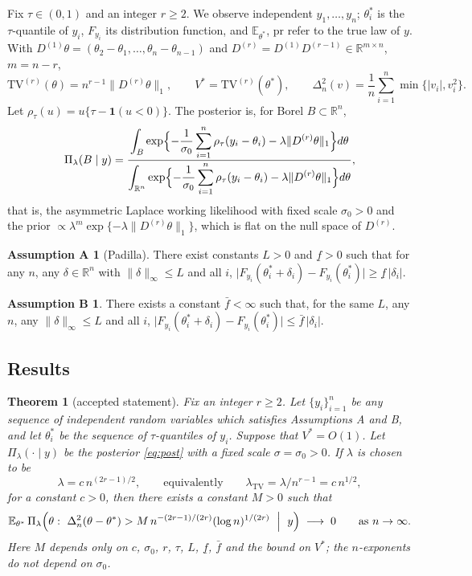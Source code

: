 \documentclass[11pt]{article}
\newtheorem{theorem}{Theorem}
\theoremstyle{definition}
\newtheorem*{assumptionA}{Assumption A}
\newtheorem*{assumptionB}{Assumption B}
\theoremstyle{remark}
\newcommand{\R}{\mathbb{R}}
\newcommand{\E}{\mathbb{E}}
\newcommand{\pr}{\mathrm{pr}}
\newcommand{\TV}{\mathrm{TV}}
\newcommand{\Dr}{D^{(r)}}
\newcommand{\lamtv}{\lambda_{\TV}}
\newcommand{\thetas}{\theta^{*}}
\newcommand{\fl}{\underline f}
\newcommand{\fu}{\bar f}
\newcommand{\ind}{\mathbf 1}
\begin{document}
Fix $\tau\in(0,1)$ and an integer $r\ge2$. We observe independent $y_1,\dots,y_n$; $\thetas_i$ is the $\tau$-quantile of $y_i$, $F_{y_i}$ its distribution function, and $\E_{\thetas}$, $\pr$ refer to the true law of $y$. With $D^{(1)}\theta=(\theta_2-\theta_1,\dots,\theta_n-\theta_{n-1})$ and $\Dr=D^{(1)}D^{(r-1)}\in\R^{m\times n}$, $m=n-r$,
\[
\TV^{(r)}(\theta)=n^{r-1}\|\Dr\theta\|_1,\qquad V^{*}=\TV^{(r)}(\thetas),\qquad
\Delta_n^2(v)=\frac1n\sum_{i=1}^n\min\{|v_i|,v_i^2\}.
\]
Let $\rho_\tau(u)=u\{\tau-\ind(u<0)\}$. The posterior is, for Borel $B\subset\R^n$,
\begin{equation}\label{eq:post}
\Pi_\lambda(B\mid y)=\frac{\displaystyle\int_B\exp\Bigl\{-\frac{1}{\sigma_0}\sum_{i=1}^n\rho_\tau(y_i-\theta_i)-\lambda\|\Dr\theta\|_1\Bigr\}d\theta}
{\displaystyle\int_{\R^n}\exp\Bigl\{-\frac{1}{\sigma_0}\sum_{i=1}^n\rho_\tau(y_i-\theta_i)-\lambda\|\Dr\theta\|_1\Bigr\}d\theta},
\end{equation}
that is, the asymmetric Laplace working likelihood with fixed scale $\sigma_0>0$ and the prior $\propto\lambda^m\exp\{-\lambda\|\Dr\theta\|_1\}$, which is flat on the null space of $\Dr$.

\begin{assumptionA}[Padilla]
There exist constants $L>0$ and $\fl>0$ such that for any $n$, any $\delta\in\R^n$ with $\|\delta\|_\infty\le L$ and all $i$,
$\bigl|F_{y_i}(\thetas_i+\delta_i)-F_{y_i}(\thetas_i)\bigr|\ge\fl\,|\delta_i|$.
\end{assumptionA}
\begin{assumptionB}
There exists a constant $\fu<\infty$ such that, for the same $L$, any $n$, any $\|\delta\|_\infty\le L$ and all $i$,
$\bigl|F_{y_i}(\thetas_i+\delta_i)-F_{y_i}(\thetas_i)\bigr|\le\fu\,|\delta_i|$.
\end{assumptionB}

\subsection{Results}

\begin{theorem}[accepted statement]\label{thm:main}
Fix an integer $r\ge 2$. Let $\{y_i\}_{i=1}^n$ be any sequence of independent random variables which satisfies Assumptions A and B, and let $\thetas_i$ be the sequence of $\tau$-quantiles of $y_i$. Suppose that $V^{*}=O(1)$. Let $\Pi_\lambda(\cdot\mid y)$ be the posterior \eqref{eq:post} with a fixed scale $\sigma=\sigma_0>0$. If $\lambda$ is chosen to be
\[
\lambda=c\,n^{(2r-1)/2},\qquad\text{equivalently}\qquad \lamtv=\lambda/n^{r-1}=c\,n^{1/2},
\]
for a constant $c>0$, then there exists a constant $M>0$ such that
\[
\E_{\thetas}\,\Pi_\lambda\Bigl(\theta:\ \Delta_n^2(\theta-\thetas)>M\,n^{-(2r-1)/(2r)}(\log n)^{1/(2r)}\ \Bigm|\ y\Bigr)\;\longrightarrow\;0
\qquad\text{as } n\to\infty .
\]
Here $M$ depends only on $c$, $\sigma_0$, $r$, $\tau$, $L$, $\fl$, $\fu$ and the bound on $V^{*}$; the $n$-exponents do not depend on $\sigma_0$.
\end{theorem}
\end{document}
